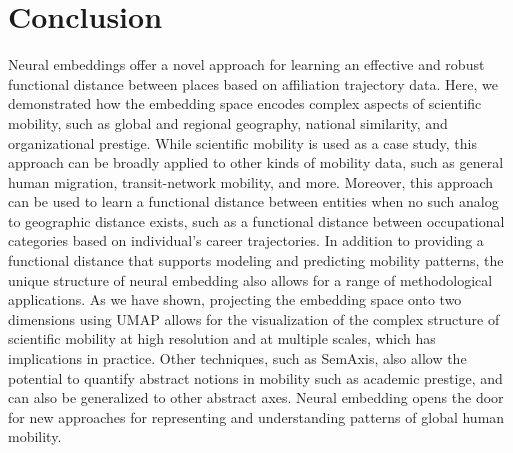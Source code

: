 \documentclass[12pt]{article} %
\begin{document}
%
%
\section*{Conclusion}

Neural embeddings offer a novel approach for learning an effective and robust functional distance between places based on affiliation trajectory data. 
Here, we demonstrated how the embedding space encodes complex aspects of scientific mobility, such as global and regional geography, national similarity, and organizational prestige.
While scientific mobility is used as a case study, this approach can be broadly applied to other kinds of mobility data, such as general human migration, transit-network mobility, and more.
Moreover, this approach can be used to learn a functional distance between entities when no such analog to geographic distance exists, such as a functional distance between occupational categories based on individual's career trajectories. 
In addition to providing a functional distance that supports modeling and predicting mobility patterns, the unique structure of neural embedding also allows for a range of methodological applications.
As we have shown, projecting the embedding space onto two dimensions using UMAP allows for the visualization of the complex structure of scientific mobility at high resolution and at multiple scales, which has implications in practice. 
Other techniques, such as SemAxis, also allow the potential to quantify abstract notions in mobility such as academic prestige, and can also be generalized to other abstract axes.
Neural embedding opens the door for new approaches for representing and understanding patterns of global human mobility.

 
\end{document}
